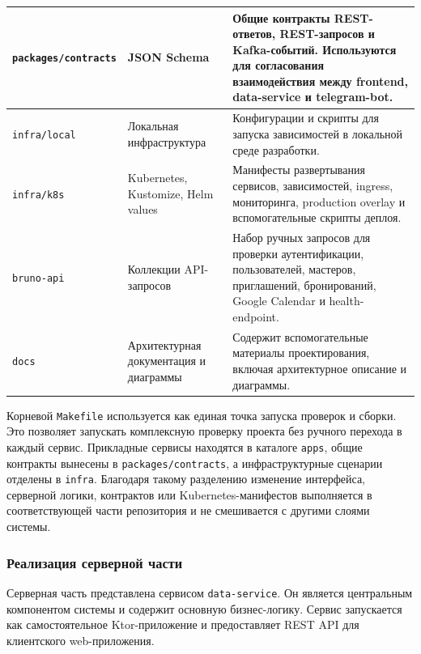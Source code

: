 \begin{xltabular}{\textwidth}{|p{4.7cm}|p{3.3cm}|X|}
\texttt{packages/contracts} & JSON Schema & Общие контракты REST-ответов, REST-запросов и Kafka-событий. Используются для согласования взаимодействия между frontend, data-service и telegram-bot. \\ \hline
\texttt{infra/local} & Локальная инфраструктура & Конфигурации и скрипты для запуска зависимостей в локальной среде разработки. \\ \hline
\texttt{infra/k8s} & Kubernetes, Kustomize, Helm values & Манифесты развертывания сервисов, зависимостей, ingress, мониторинга, production overlay и вспомогательные скрипты деплоя. \\ \hline
\texttt{bruno-api} & Коллекции API-запросов & Набор ручных запросов для проверки аутентификации, пользователей, мастеров, приглашений, бронирований, Google Calendar и health-endpoint. \\ \hline
\texttt{docs} & Архитектурная документация и диаграммы & Содержит вспомогательные материалы проектирования, включая архитектурное описание и диаграммы. \\ \hline
\end{xltabular}

Корневой \texttt{Makefile} используется как единая точка запуска проверок и сборки. Это позволяет запускать комплексную проверку проекта без ручного перехода в каждый сервис. Прикладные сервисы находятся в каталоге \texttt{apps}, общие контракты вынесены в \texttt{packages/contracts}, а инфраструктурные сценарии отделены в \texttt{infra}. Благодаря такому разделению изменение интерфейса, серверной логики, контрактов или Kubernetes-манифестов выполняется в соответствующей части репозитория и не смешивается с другими слоями системы.

\subsubsection{Реализация серверной части}

Серверная часть представлена сервисом \texttt{data-service}. Он является центральным компонентом системы и содержит основную бизнес-логику. Сервис запускается как самостоятельное Ktor-приложение и предоставляет REST API для клиентского web-приложения.

